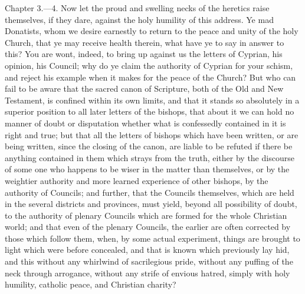Chapter 3.—4. Now let the proud and swelling necks of the heretics raise themselves, if they dare, against the holy humility of this address. Ye mad Donatists, whom we desire earnestly to return to the peace and unity of the holy Church, that ye may receive health therein, what have ye to say in answer to this? You are wont, indeed, to bring up against us the letters of Cyprian, his opinion, his Council; why do ye claim the authority of Cyprian for your schism, and reject his example when it makes for the peace of the Church? But who can fail to be aware that the sacred canon of Scripture, both of the Old and New Testament, is confined within its own limits, and that it stands so absolutely in a superior position to all later letters of the bishops, that about it we can hold no manner of doubt or disputation whether what is confessedly contained in it is right and true; but that all the letters of bishops which have been written, or are being written, since the closing of the canon, are liable to be refuted if there be anything contained in them which strays from the truth, either by the discourse of some one who happens to be wiser in the matter than themselves, or by the weightier authority and more learned experience of other bishops, by the authority of Councils; and further, that the Councils themselves, which are held in the several districts and provinces, must yield, beyond all possibility of doubt, to the authority of plenary Councils which are formed for the whole Christian world; and that even of the plenary Councils, the earlier are often corrected by those which follow them, when, by some actual experiment, things are brought to light which were before concealed, and that is known which previously lay hid, and this without any whirlwind of sacrilegious pride, without any puffing of the neck through arrogance, without any strife of envious hatred, simply with holy humility, catholic peace, and Christian charity?


